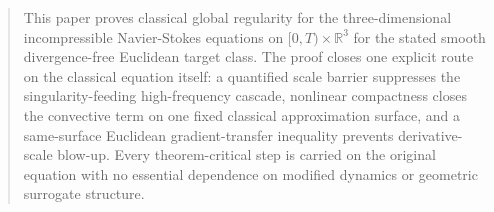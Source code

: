 \begin{abstract}
This paper proves classical global regularity for the three-dimensional incompressible Navier-Stokes equations on \([0,T)\times\mathbb{R}^3\) for the stated smooth divergence-free Euclidean target class. The proof closes one explicit route on the classical equation itself: a quantified scale barrier suppresses the singularity-feeding high-frequency cascade, nonlinear compactness closes the convective term on one fixed classical approximation surface, and a same-surface Euclidean gradient-transfer inequality prevents derivative-scale blow-up. Every theorem-critical step is carried on the original equation with no essential dependence on modified dynamics or geometric surrogate structure.
\end{abstract}
